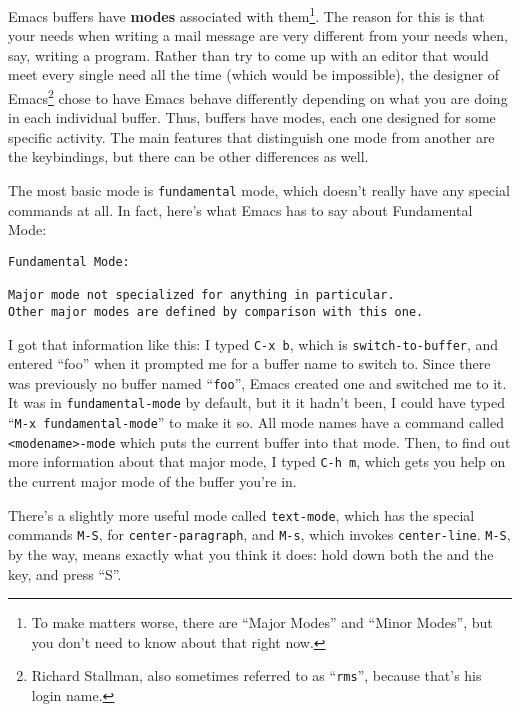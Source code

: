 Emacs buffers have {\bf modes} associated with them\footnote{To make
  matters worse, there are ``Major Modes'' and ``Minor Modes'', but
  you don't need to know about that right now.}.  The reason for this
is that your needs when writing a mail message are very different from
your needs when, say, writing a program.  Rather than try to come up
with an editor that would meet every single need all the time (which
would be impossible), the designer of Emacs\footnote{Richard
  Stallman, also sometimes referred to as
  ``{\tt rms}'', because that's his login name.} chose to have Emacs
behave differently depending on what you are doing in each individual
buffer.  Thus, buffers have modes, each one designed for some specific
activity.  The main features that distinguish one mode from another
are the keybindings, but there can be other differences as well.

        The most basic mode is {\tt fundamental} mode, which doesn't
really have any special commands at all.  In fact, here's what Emacs
has to say about Fundamental Mode:

\begin{tt}
   \begin{verbatim}
Fundamental Mode:

Major mode not specialized for anything in particular.
Other major modes are defined by comparison with this one.
\end{verbatim}
\end{tt}

        I got that information like this: I typed {\tt C-x~b}, which
is {\tt switch-to-buffer}, and entered ``foo'' when it prompted me for
a buffer name to switch to.  Since there was previously no buffer
named ``{\tt foo}'', Emacs created one and switched me to it.  It was
in {\tt fundamental-mode} by default, but it it hadn't been, I could
have typed ``{\tt M-x~fundamental-mode}'' to make it so.  All mode
names have a command called {\tt <modename>-mode} which puts the
current buffer into that mode.  Then, to find out more information
about that major mode, I typed {\tt C-h~m}, which gets you help on the
current major mode of the buffer you're in.

        There's a slightly more useful mode called {\tt text-mode},
which has the special commands {\tt M-S}, for {\tt center-paragraph},
and {\tt M-s}, which invokes {\tt center-line}.  {\tt M-S}, by the
way, means exactly what you think it does: hold down both the
 and the  key, and press ``S''.

